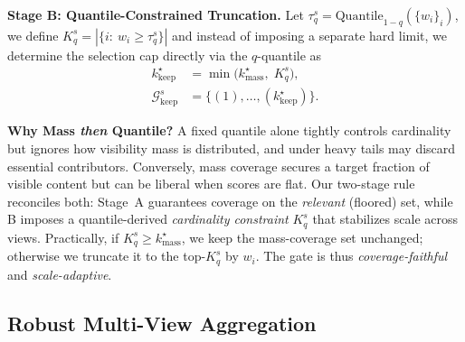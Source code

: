 \textbf{Stage B: Quantile-Constrained Truncation.}
Let $\tau_{q}^s=\mathrm{Quantile}_{1-q}(\{w_i\}_i)$, we define 
$K_q^{s}=|\{ i:\ w_i \ge \tau_{q}^s \}|$ and instead of imposing a separate hard limit, we determine the selection cap directly via the $q$-quantile as
\begin{equation}
\begin{aligned}
k_{\mathrm{keep}}^{\star} & = \min\!\big(k_{\mathrm{mass}}^\star,\; K_q^{s}\big), \\
\mathcal G_{\mathrm{keep}}^{s} & = \big\{(1),\ldots,(k_{\mathrm{keep}}^{\star})\big\}.
\label{eq:quantile_truncate}
\end{aligned}
\end{equation}

\textbf{Why Mass \emph{then} Quantile?}
A fixed quantile alone tightly controls cardinality but ignores how visibility mass is distributed,
and under heavy tails may discard essential contributors.
Conversely, mass coverage secures a target fraction of visible content but can be liberal when scores are flat.
Our two-stage rule reconciles both: Stage~A guarantees coverage on the \emph{relevant} (floored) set,
while B imposes a quantile-derived \emph{cardinality constraint} $K_q^{s}$ that stabilizes scale across views.
Practically, if $K_q^{s}\!\ge\!k_{\mathrm{mass}}^\star$, we keep the mass-coverage set unchanged;
otherwise we truncate it to the top-$K_q^{s}$ by $w_i$.
The gate is thus \emph{coverage-faithful} and \emph{scale-adaptive}.

\subsection{Robust Multi-View Aggregation}
\label{sec:median}

